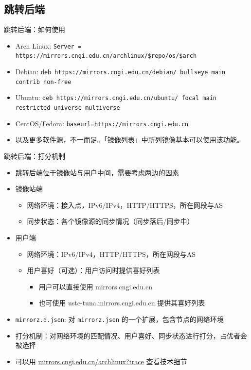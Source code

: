 \documentclass{ctexbeamer}
\newcommand{\T}[1]{\texttt{#1}}
\begin{document}
\subsection{跳转后端}
\begin{frame}{跳转后端：如何使用}
  \begin{itemize}
    \item Arch Linux: \T{Server = https://mirrors.cngi.edu.cn/archlinux/\$repo/os/\$arch}
    \item Debian: \T{deb https://mirrors.cngi.edu.cn/debian/ bullseye main contrib non-free}
    \item Ubuntu: \T{deb https://mirrors.cngi.edu.cn/ubuntu/ focal main restricted universe multiverse}
    \item CentOS/Fedora: \T{baseurl=https://mirrors.cngi.edu.cn}
    \item 以及更多软件源，不一而足。「镜像列表」中所列镜像基本可以使用该功能。
  \end{itemize}
\end{frame}

\begin{frame}{跳转后端：打分机制}
  \begin{itemize}
    \item 跳转后端位于镜像站与用户中间，需要考虑两边的因素
    \item 镜像站端\begin{itemize}
      \item 网络环境：接入点，IPv6/IPv4，HTTP/HTTPS，所在网段与AS
      \item 同步状态：各个镜像源的同步情况（同步落后/同步中）
    \end{itemize}
    \item 用户端\begin{itemize}
      \item 网络环境：IPv6/IPv4，HTTP/HTTPS，所在网段与AS
      \item 用户喜好（可选）：用户访问时提供喜好列表\begin{itemize}
        \item 用户可以直接使用 mirrors.cngi.edu.cn
        \item 也可使用 ustc-tuna.mirrors.cngi.edu.cn 提供其喜好列表
      \end{itemize}
    \end{itemize}
    \item \T{mirrorz.d.json}: 对 \T{mirrorz.json} 的一个扩展，包含节点的网络环境
    \item 打分机制：对网络环境的匹配情况、用户喜好、同步状态进行打分，占优者会被选择
    \item 可以用 \url{mirrors.cngi.edu.cn/archlinux?trace} 查看技术细节
  \end{itemize}
\end{frame}
\end{document}
